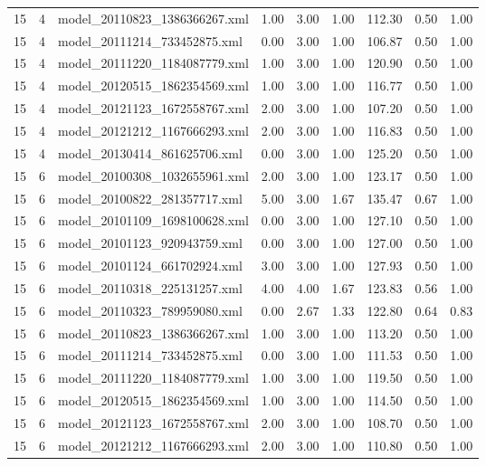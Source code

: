 \begin{table}[ht]
\begin{tabular}{rrlrrrrrr}
   15 &   4 & model\_20110823\_1386366267.xml & 1.00 & 3.00 & 1.00 & 112.30 & 0.50 & 1.00 \\ 
   15 &   4 & model\_20111214\_733452875.xml & 0.00 & 3.00 & 1.00 & 106.87 & 0.50 & 1.00 \\ 
   15 &   4 & model\_20111220\_1184087779.xml & 1.00 & 3.00 & 1.00 & 120.90 & 0.50 & 1.00 \\ 
   15 &   4 & model\_20120515\_1862354569.xml & 1.00 & 3.00 & 1.00 & 116.77 & 0.50 & 1.00 \\ 
   15 &   4 & model\_20121123\_1672558767.xml & 2.00 & 3.00 & 1.00 & 107.20 & 0.50 & 1.00 \\ 
   15 &   4 & model\_20121212\_1167666293.xml & 2.00 & 3.00 & 1.00 & 116.83 & 0.50 & 1.00 \\ 
   15 &   4 & model\_20130414\_861625706.xml & 0.00 & 3.00 & 1.00 & 125.20 & 0.50 & 1.00 \\ 
   15 &   6 & model\_20100308\_1032655961.xml & 2.00 & 3.00 & 1.00 & 123.17 & 0.50 & 1.00 \\ 
   15 &   6 & model\_20100822\_281357717.xml & 5.00 & 3.00 & 1.67 & 135.47 & 0.67 & 1.00 \\ 
   15 &   6 & model\_20101109\_1698100628.xml & 0.00 & 3.00 & 1.00 & 127.10 & 0.50 & 1.00 \\ 
   15 &   6 & model\_20101123\_920943759.xml & 0.00 & 3.00 & 1.00 & 127.00 & 0.50 & 1.00 \\ 
   15 &   6 & model\_20101124\_661702924.xml & 3.00 & 3.00 & 1.00 & 127.93 & 0.50 & 1.00 \\ 
   15 &   6 & model\_20110318\_225131257.xml & 4.00 & 4.00 & 1.67 & 123.83 & 0.56 & 1.00 \\ 
   15 &   6 & model\_20110323\_789959080.xml & 0.00 & 2.67 & 1.33 & 122.80 & 0.64 & 0.83 \\ 
   15 &   6 & model\_20110823\_1386366267.xml & 1.00 & 3.00 & 1.00 & 113.20 & 0.50 & 1.00 \\ 
   15 &   6 & model\_20111214\_733452875.xml & 0.00 & 3.00 & 1.00 & 111.53 & 0.50 & 1.00 \\ 
   15 &   6 & model\_20111220\_1184087779.xml & 1.00 & 3.00 & 1.00 & 119.50 & 0.50 & 1.00 \\ 
   15 &   6 & model\_20120515\_1862354569.xml & 1.00 & 3.00 & 1.00 & 114.50 & 0.50 & 1.00 \\ 
   15 &   6 & model\_20121123\_1672558767.xml & 2.00 & 3.00 & 1.00 & 108.70 & 0.50 & 1.00 \\ 
   15 &   6 & model\_20121212\_1167666293.xml & 2.00 & 3.00 & 1.00 & 110.80 & 0.50 & 1.00 \\ 

\end{tabular}
\end{table}
